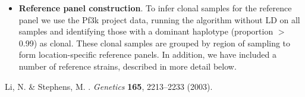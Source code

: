 \documentclass{nature}
\newcounter{firstbib}
\begin{document}
\begin{itemize}
\item {\bf Reference panel construction}. To infer clonal samples for the reference panel we use the Pf3k project data, running the algorithm without LD on all samples and identifying those with a dominant haplotype (proportion $>$ 0.99) as clonal.  These clonal samples are grouped by region of sampling to form location-specific reference panels.  In addition, we have included a number of reference strains, described in more detail below.

\end{itemize}


\begin{thebibliography}{9}
\setcounter{enumiv}{\value{firstbib}}
{Li, N.} \& {Stephens, M.}
.
\newblock \emph{{Genetics}} \textbf{{165}},
  {2213--2233} ({2003}).
\end{thebibliography}
\end{document}
